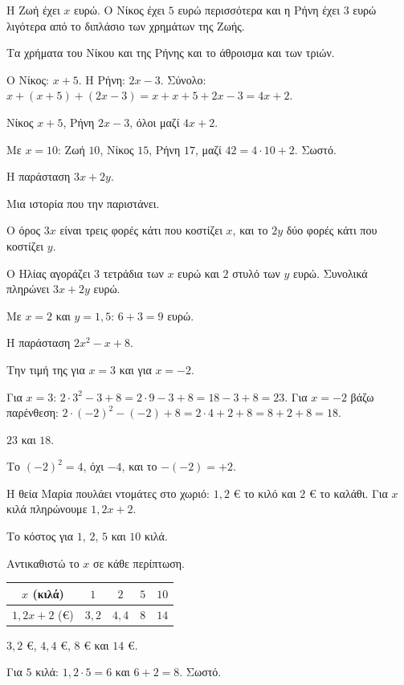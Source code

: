 
\tixero Η Ζωή έχει $x$ ευρώ. Ο Νίκος έχει $5$ ευρώ περισσότερα και η Ρήνη έχει $3$ ευρώ λιγότερα από το διπλάσιο των χρημάτων της Ζωής.\par
\tithelo Τα χρήματα του Νίκου και της Ρήνης και το άθροισμα και των τριών.\par
\possindeo Ο Νίκος: $x+5$. Η Ρήνη: $2x-3$. Σύνολο: $x+(x+5)+(2x-3)=x+x+5+2x-3=4x+2$.\par
\apantisi Νίκος $x+5$, Ρήνη $2x-3$, όλοι μαζί $4x+2$.\par
\elegxos Με $x=10$: Ζωή $10$, Νίκος $15$, Ρήνη $17$, μαζί $42=4\cdot10+2$. Σωστό.

\tixero Η παράσταση $3x+2y$.\par
\tithelo Μια ιστορία που την παριστάνει.\par
\possindeo Ο όρος $3x$ είναι τρεις φορές κάτι που κοστίζει $x$, και το $2y$ δύο φορές κάτι που κοστίζει $y$.\par
\apantisi Ο Ηλίας αγοράζει $3$ τετράδια των $x$ ευρώ και $2$ στυλό των $y$ ευρώ. Συνολικά πληρώνει $3x+2y$ ευρώ.\par
\elegxos Με $x=2$ και $y=1{,}5$: $6+3=9$ ευρώ.

\tixero Η παράσταση $2x^2-x+8$.\par
\tithelo Την τιμή της για $x=3$ και για $x=-2$.\par
\possindeo Για $x=3$: $2\cdot3^2-3+8=2\cdot9-3+8=18-3+8=23$. Για $x=-2$ βάζω παρένθεση: $2\cdot(-2)^2-(-2)+8=2\cdot4+2+8=8+2+8=18$.\par
\apantisi $23$ και $18$.\par
\elegxos Το $(-2)^2=4$, όχι $-4$, και το $-(-2)=+2$.

\tixero Η θεία Μαρία πουλάει ντομάτες στο χωριό: $1{,}2$ € το κιλό και $2$ € το καλάθι. Για $x$ κιλά πληρώνουμε $1{,}2x+2$.\par
\tithelo Το κόστος για $1$, $2$, $5$ και $10$ κιλά.\par
\possindeo Αντικαθιστώ το $x$ σε κάθε περίπτωση.\par
\begin{center}
\renewcommand{\arraystretch}{1.3}
\begin{tabular}{@{}c|cccc@{}}
$x$ (κιλά) & $1$ & $2$ & $5$ & $10$\\\hline
$1{,}2x+2$ (€) & $3{,}2$ & $4{,}4$ & $8$ & $14$\\
\end{tabular}
\end{center}
\apantisi $3{,}2$ €, $4{,}4$ €, $8$ € και $14$ €.\par
\elegxos Για $5$ κιλά: $1{,}2\cdot5=6$ και $6+2=8$. Σωστό.

